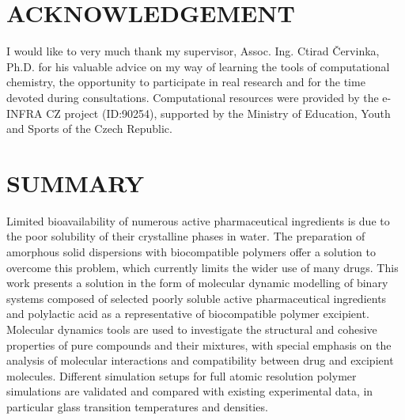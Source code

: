 \newpage
 

%


\newpage
\thispagestyle{empty}

\vspace*{\fill}
\section*{ACKNOWLEDGEMENT}
\mbox
\indent I would like to very much thank my supervisor, Assoc. Ing. Ctirad Červinka, Ph.D. for his valuable advice on my way of learning the tools of computational chemistry, the opportunity to participate in real research and for the time devoted during consultations. Computational resources were provided by the e-INFRA CZ project (ID:90254), supported by the Ministry of Education, Youth and Sports of the Czech Republic.





\newpage
\thispagestyle{empty}

\section*{SUMMARY}
Limited bioavailability of numerous active pharmaceutical ingredients is due to the poor solubility of their crystalline phases in water. The preparation of amorphous solid dispersions with biocompatible polymers offer a solution to overcome this problem, which currently limits the wider use of many drugs. This work presents a solution in the form of molecular dynamic modelling of binary systems composed of selected poorly soluble active pharmaceutical ingredients and polylactic acid as a representative of biocompatible polymer excipient. Molecular dynamics tools are used to investigate the structural and cohesive properties of pure compounds and their mixtures, with special emphasis on the analysis of molecular interactions and compatibility between drug and excipient molecules. Different simulation setups for full atomic resolution polymer simulations are validated and compared with existing experimental data, in particular glass transition temperatures and densities.

